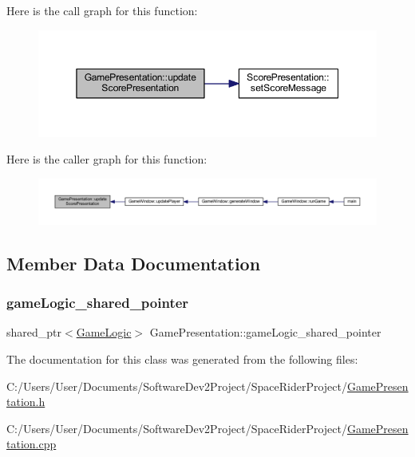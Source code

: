 Here is the call graph for this function\+:
\nopagebreak
\begin{figure}[H]
\begin{center}
\leavevmode
\includegraphics[width=350pt]{class_game_presentation_ab2cf74842583bf5b63e5973fb8b657be_cgraph}
\end{center}
\end{figure}
Here is the caller graph for this function\+:
\nopagebreak
\begin{figure}[H]
\begin{center}
\leavevmode
\includegraphics[width=350pt]{class_game_presentation_ab2cf74842583bf5b63e5973fb8b657be_icgraph}
\end{center}
\end{figure}


\subsection{Member Data Documentation}
\mbox{\label{class_game_presentation_a2f149f73bdd87ded8a6d66ecc427352f}} 
\subsubsection{\texorpdfstring{game\+Logic\+\_\+shared\+\_\+pointer}{gameLogic\_shared\_pointer}}
{\footnotesize\ttfamily shared\+\_\+ptr$<$\hyperlink{class_game_logic}{Game\+Logic}$>$ Game\+Presentation\+::game\+Logic\+\_\+shared\+\_\+pointer}



The documentation for this class was generated from the following files\+:\begin{DoxyCompactItemize}
\item 
C\+:/\+Users/\+User/\+Documents/\+Software\+Dev2\+Project/\+Space\+Rider\+Project/\hyperlink{_game_presentation_8h}{Game\+Presentation.\+h}\item 
C\+:/\+Users/\+User/\+Documents/\+Software\+Dev2\+Project/\+Space\+Rider\+Project/\hyperlink{_game_presentation_8cpp}{Game\+Presentation.\+cpp}\end{DoxyCompactItemize}
